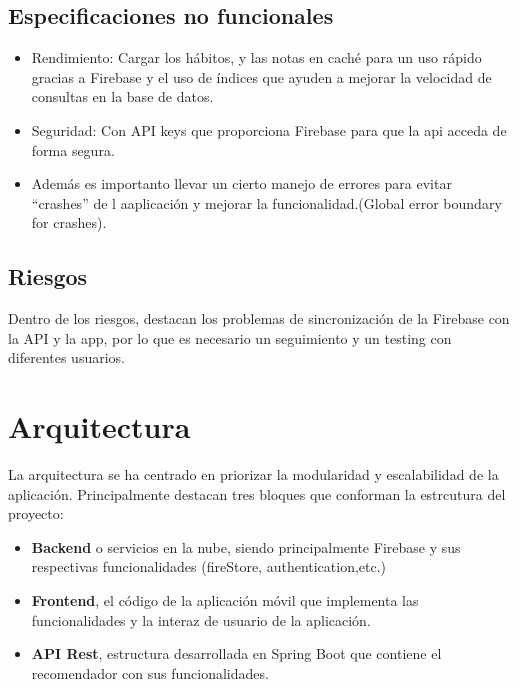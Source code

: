 \subsection{Especificaciones no funcionales}
\begin{itemize}
    \item Rendimiento: Cargar los hábitos, y las notas en caché para un uso rápido gracias a Firebase y el uso de índices que ayuden a mejorar la velocidad de consultas en la base de datos.
    \item Seguridad: Con API keys que proporciona Firebase para que la api acceda de forma segura.
    \item Además es importanto llevar un cierto manejo de errores para evitar ``crashes'' de l aaplicación y mejorar la funcionalidad.(Global error boundary for crashes).
\end{itemize}

\subsection{Riesgos}
Dentro de los riesgos, destacan los problemas de sincronización de la Firebase con la API y la app, por lo que es necesario un seguimiento y un testing con diferentes usuarios.


\section{Arquitectura}

La arquitectura se ha centrado en priorizar la modularidad y escalabilidad de la aplicación. Principalmente destacan tres bloques que conforman la estrcutura del proyecto:

\begin{itemize}
    \item \textbf{Backend} o servicios en la nube, siendo principalmente Firebase y sus respectivas funcionalidades (fireStore, authentication,etc.)
    \item \textbf{Frontend}, el código de la aplicación móvil que implementa las funcionalidades y la interaz de usuario de la aplicación.
    \item  \textbf{API Rest}, estructura desarrollada en Spring Boot que contiene el recomendador con sus funcionalidades.
\end{itemize}

